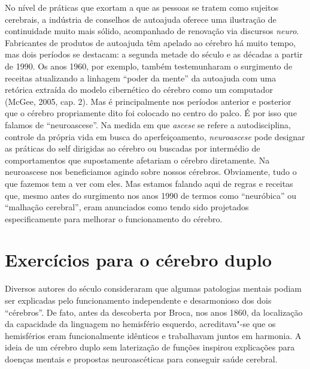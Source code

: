 No nível de práticas que exortam a que as pessoas se tratem como
sujeitos cerebrais, a indústria de conselhos de autoajuda oferece uma
ilustração de continuidade muito mais sólido, acompanhado de renovação
via discursos \emph{neuro}. Fabricantes de produtos de autoajuda têm
apelado ao cérebro há muito tempo, mas dois períodos se destacam: a
segunda metade do século  e as décadas a partir de 1990. Os anos
1960, por exemplo, também testemunharam o surgimento de receitas
atualizando a linhagem ``poder da mente'' da autoajuda com uma retórica
extraída do modelo cibernético do cérebro como um computador (McGee,
2005, cap. 2). Mas é principalmente nos períodos anterior e posterior
que o cérebro propriamente dito foi colocado no centro do palco. É por
isso que falamos de ``neuroascese''. Na medida em que \emph{ascese} se
refere a autodisciplina, controle da própria vida em busca do
aperfeiçoamento, \emph{neuroascese} pode designar as práticas do self
dirigidas ao cérebro ou buscadas por intermédio de comportamentos que
supostamente afetariam o cérebro diretamente. Na neuroascese nos
beneficiamos agindo sobre nossos cérebros. Obviamente, tudo o que
fazemos tem a ver com eles. Mas estamos falando aqui de regras e
receitas que, mesmo antes do surgimento nos anos 1990 de termos como
``neuróbica'' ou ``malhação cerebral'', eram anunciados como tendo sido
projetados especificamente para melhorar o funcionamento do cérebro.

\chapter{Exercícios para o cérebro duplo}

Diversos autores do século  consideraram que algumas patologias
mentais podiam ser explicadas pelo funcionamento independente e
desarmonioso dos dois ``cérebros''. De fato, antes da descoberta por
Broca, nos anos 1860, da localização da capacidade da linguagem no
hemisfério esquerdo, acreditava"-se que os hemisférios eram
funcionalmente idênticos e trabalhavam juntos em harmonia. A ideia de um
cérebro duplo sem laterização de funções inspirou explicações para
doenças mentais e propostas neuroascéticas para conseguir saúde
cerebral.

